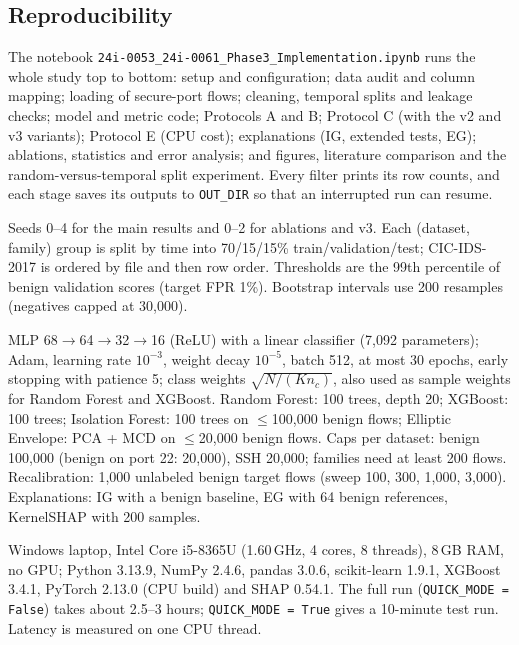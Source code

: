 \documentclass[pdflatex,sn-mathphys-num,iicol]{sn-jnl}%
\begin{document}
\begin{appendices}
\section{Reproducibility}\label{app:repro}

The notebook \texttt{24i-0053\_\allowbreak 24i-0061\_\allowbreak Phase3\_\allowbreak Implementation.ipynb} runs the whole study top to bottom: setup and configuration; data audit and column mapping; loading of secure-port flows; cleaning, temporal splits and leakage checks; model and metric code; Protocols A and B; Protocol C (with the v2 and v3 variants); Protocol E (CPU cost); explanations (IG, extended tests, EG); ablations, statistics and error analysis; and figures, literature comparison and the random-versus-temporal split experiment. Every filter prints its row counts, and each stage saves its outputs to \texttt{OUT\_DIR} so that an interrupted run can resume.

Seeds 0--4 for the main results and 0--2 for ablations and v3. Each (dataset, family) group is split by time into 70/15/15\% train/validation/test; CIC-IDS-2017 is ordered by file and then row order. Thresholds are the 99th percentile of benign validation scores (target FPR 1\%). Bootstrap intervals use 200 resamples (negatives capped at 30,000).

MLP 68$\to$64$\to$32$\to$16 (ReLU) with a linear classifier (7,092 parameters); Adam, learning rate $10^{-3}$, weight decay $10^{-5}$, batch 512, at most 30 epochs, early stopping with patience 5; class weights $\sqrt{N/(Kn_c)}$, also used as sample weights for Random Forest and XGBoost. Random Forest: 100 trees, depth 20; XGBoost: 100 trees; Isolation Forest: 100 trees on $\le$100,000 benign flows; Elliptic Envelope: PCA + MCD on $\le$20,000 benign flows. Caps per dataset: benign 100,000 (benign on port 22: 20,000), SSH 20,000; families need at least 200 flows. Recalibration: 1,000 unlabeled benign target flows (sweep 100, 300, 1,000, 3,000). Explanations: IG with a benign baseline, EG with 64 benign references, KernelSHAP with 200 samples.

Windows laptop, Intel Core i5-8365U (1.60\,GHz, 4 cores, 8 threads), 8\,GB RAM, no GPU; Python 3.13.9, NumPy 2.4.6, pandas 3.0.6, scikit-learn 1.9.1, XGBoost 3.4.1, PyTorch 2.13.0 (CPU build) and SHAP 0.54.1. The full run (\texttt{QUICK\_MODE = False}) takes about 2.5--3 hours; \texttt{QUICK\_MODE = True} gives a 10-minute test run. Latency is measured on one CPU thread.

\end{appendices}
\end{document}
